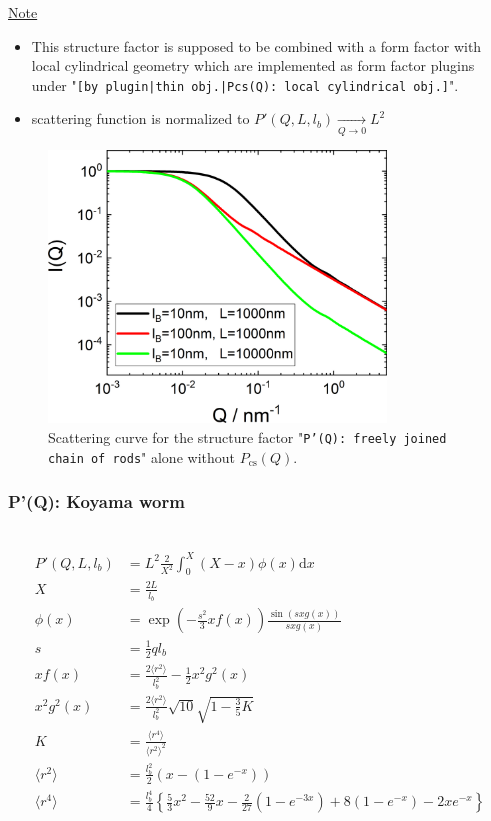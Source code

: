 \noindent
\underline{Note}
\begin{itemize}
  \item This structure factor is supposed to be combined with a form factor with local cylindrical geometry which are implemented as form factor plugins
under "\texttt{[by plugin|thin obj.|Pcs(Q): local cylindrical obj.]}".
  \item scattering function is normalized to $P'(Q,L,l_b) \xrightarrow[Q\rightarrow 0]{} L^2$
\end{itemize}

\begin{figure}[htb]
\begin{center}
\includegraphics[width=0.8\textwidth]{../images/form_factor/polymer_semiflexible/PprimeFreelyJoinedRods.png}
\end{center}
\caption{Scattering curve for the structure factor "\texttt{P'(Q): freely joined chain of rods}" alone without $P_\mathrm{cs}(Q)$.}
\label{fig_IQ:PprimeFreelyJoinedChainOfRods}
\end{figure}

\clearpage
\subsubsection{P'(Q): Koyama worm} ~\\
\label{plugin:Pprime4koyama}
\cite{Koyama1973,Koyama1974,Poetschke2000}
\begin{align}
P'(Q,L,l_b) &= L^2\frac{2}{X^2}\int_0^X (X-x)\phi(x)\mathrm{d}x \\
X &= \frac{2L}{l_b} \label{eq:PprimeKoyama}\\
\phi(x) &= \exp\left(-\frac{s^2}{3}xf(x)\right) \frac{\sin(sxg(x))}{sxg(x)} \\
s &= \frac12 ql_b \\
xf(x) &= \frac{2\langle r^2\rangle}{l_b^2} - \frac12 x^2g^2(x) \\
x^2g^2(x) &= \frac{2\langle r^2\rangle}{l_b^2} \sqrt{10}\sqrt{1-\frac35 K} \\
K &= \frac{\langle r^4\rangle}{\langle r^2\rangle^2} \\
\langle r^2\rangle &= \frac{l_b^2}{2} \left(x-\left(1-e^{-x}\right)\right)\\
\langle r^4\rangle &= \frac{l_b^4}{4} \left\{\frac53 x^2 -\frac{52}{9}x-\frac{2}{27}\left(1-e^{-3x}\right)+8\left(1-e^{-x}\right)-2xe^{-x}\right\}
\end{align}


